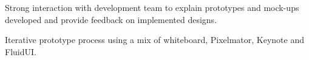 {{          \item Strong interaction with development team to explain prototypes and mock-ups developed and provide feedback on implemented designs.
          \item Iterative prototype process using a mix of whiteboard, Pixelmator, Keynote and FluidUI.
        }
}
